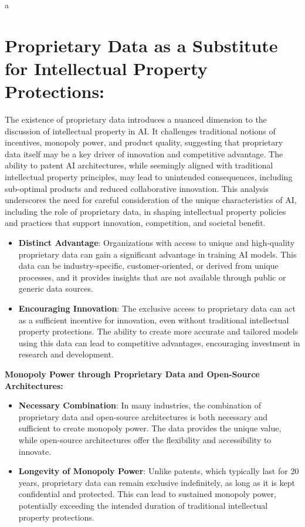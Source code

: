 a\documentclass{article}[10pt]
\begin{document}
\section{Proprietary Data as a Substitute for Intellectual Property Protections:}

The existence of proprietary data introduces a nuanced dimension to the discussion of intellectual property in AI. It challenges traditional notions of incentives, monopoly power, and product quality, suggesting that proprietary data itself may be a key driver of innovation and competitive advantage. The ability to patent AI architectures, while seemingly aligned with traditional intellectual property principles, may lead to unintended consequences, including sub-optimal products and reduced collaborative innovation. This analysis underscores the need for careful consideration of the unique characteristics of AI, including the role of proprietary data, in shaping intellectual property policies and practices that support innovation, competition, and societal benefit.

\begin{itemize}
	\item \textbf{Distinct Advantage}: Organizations with access to unique and high-quality proprietary data can gain a significant advantage in training AI models. This data can be industry-specific, customer-oriented, or derived from unique processes, and it provides insights that are not available through public or generic data sources.
	\item \textbf{Encouraging Innovation}: The exclusive access to proprietary data can act as a sufficient incentive for innovation, even without traditional intellectual property protections. The ability to create more accurate and tailored models using this data can lead to competitive advantages, encouraging investment in research and development.
\end{itemize}

\noindent \textbf{Monopoly Power through Proprietary Data and Open-Source Architectures:}

\begin{itemize}
	\item \textbf{Necessary Combination}: In many industries, the combination of proprietary data and open-source architectures is both necessary and sufficient to create monopoly power. The data provides the unique value, while open-source architectures offer the flexibility and accessibility to innovate.
	\item \textbf{Longevity of Monopoly Power}: Unlike patents, which typically last for 20 years, proprietary data can remain exclusive indefinitely, as long as it is kept confidential and protected. This can lead to sustained monopoly power, potentially exceeding the intended duration of traditional intellectual property protections.
\end{itemize}
\end{document}
